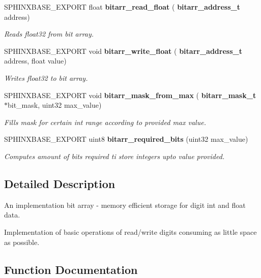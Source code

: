 \begin{DoxyCompactItemize}
S\+P\+H\+I\+N\+X\+B\+A\+S\+E\+\_\+\+E\+X\+P\+O\+RT float \textbf{ bitarr\+\_\+read\+\_\+float} (\textbf{ bitarr\+\_\+address\+\_\+t} address)
\begin{DoxyCompactList}\small\item\em Reads float32 from bit array. \end{DoxyCompactList}\item 
S\+P\+H\+I\+N\+X\+B\+A\+S\+E\+\_\+\+E\+X\+P\+O\+RT void \textbf{ bitarr\+\_\+write\+\_\+float} (\textbf{ bitarr\+\_\+address\+\_\+t} address, float value)
\begin{DoxyCompactList}\small\item\em Writes float32 to bit array. \end{DoxyCompactList}\item 
S\+P\+H\+I\+N\+X\+B\+A\+S\+E\+\_\+\+E\+X\+P\+O\+RT void \textbf{ bitarr\+\_\+mask\+\_\+from\+\_\+max} (\textbf{ bitarr\+\_\+mask\+\_\+t} $\ast$bit\+\_\+mask, uint32 max\+\_\+value)
\begin{DoxyCompactList}\small\item\em Fills mask for certain int range according to provided max value. \end{DoxyCompactList}\item 
S\+P\+H\+I\+N\+X\+B\+A\+S\+E\+\_\+\+E\+X\+P\+O\+RT uint8 \textbf{ bitarr\+\_\+required\+\_\+bits} (uint32 max\+\_\+value)
\begin{DoxyCompactList}\small\item\em Computes amount of bits required ti store integers upto value provided. \end{DoxyCompactList}\end{DoxyCompactItemize}


\subsection{Detailed Description}
An implementation bit array -\/ memory efficient storage for digit int and float data. 

Implementation of basic operations of read/write digits consuming as little space as possible. 

\subsection{Function Documentation}
\mbox{\label{bitarr_8h_ac4e41af285dcd2f5f85037ae7889b57c}} 

